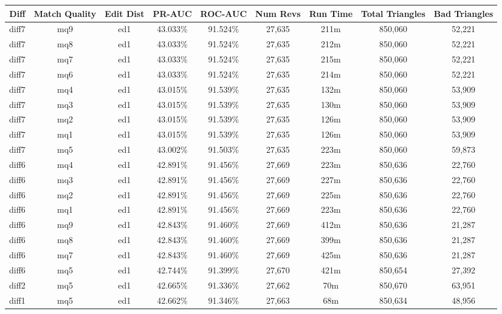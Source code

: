 \begin{sidewaystable}[!ph]
  \begin{center}
    \begin{tabular}{|c|c|c||c|c||c|c|c|c|}
\hline
Diff & Match Quality & Edit Dist
        & PR-AUC & ROC-AUC
        & Num Revs & Run Time
        & Total Triangles & Bad Triangles \\
\hline
\hline
diff7 & mq9 & ed1 & 43.033\% & 91.524\% & 27,635 & 211m & 850,060 & 52,221 \\
diff7 & mq8 & ed1 & 43.033\% & 91.524\% & 27,635 & 212m & 850,060 & 52,221 \\
diff7 & mq7 & ed1 & 43.033\% & 91.524\% & 27,635 & 215m & 850,060 & 52,221 \\
diff7 & mq6 & ed1 & 43.033\% & 91.524\% & 27,635 & 214m & 850,060 & 52,221 \\
diff7 & mq4 & ed1 & 43.015\% & 91.539\% & 27,635 & 132m & 850,060 & 53,909 \\
diff7 & mq3 & ed1 & 43.015\% & 91.539\% & 27,635 & 130m & 850,060 & 53,909 \\
diff7 & mq2 & ed1 & 43.015\% & 91.539\% & 27,635 & 126m & 850,060 & 53,909 \\
diff7 & mq1 & ed1 & 43.015\% & 91.539\% & 27,635 & 126m & 850,060 & 53,909 \\
diff7 & mq5 & ed1 & 43.002\% & 91.503\% & 27,635 & 223m & 850,060 & 59,873 \\
diff6 & mq4 & ed1 & 42.891\% & 91.456\% & 27,669 & 223m & 850,636 & 22,760 \\
diff6 & mq3 & ed1 & 42.891\% & 91.456\% & 27,669 & 227m & 850,636 & 22,760 \\
diff6 & mq2 & ed1 & 42.891\% & 91.456\% & 27,669 & 225m & 850,636 & 22,760 \\
diff6 & mq1 & ed1 & 42.891\% & 91.456\% & 27,669 & 223m & 850,636 & 22,760 \\
diff6 & mq9 & ed1 & 42.843\% & 91.460\% & 27,669 & 412m & 850,636 & 21,287 \\
diff6 & mq8 & ed1 & 42.843\% & 91.460\% & 27,669 & 399m & 850,636 & 21,287 \\
diff6 & mq7 & ed1 & 42.843\% & 91.460\% & 27,669 & 425m & 850,636 & 21,287 \\
diff6 & mq5 & ed1 & 42.744\% & 91.399\% & 27,670 & 421m & 850,654 & 27,392 \\
diff2 & mq5 & ed1 & 42.665\% & 91.336\% & 27,662 & 70m & 850,670 & 63,951 \\
diff1 & mq5 & ed1 & 42.662\% & 91.346\% & 27,663 & 68m & 850,634 & 48,956 \\

\end{tabular}
\end{center}
\end{sidewaystable}
